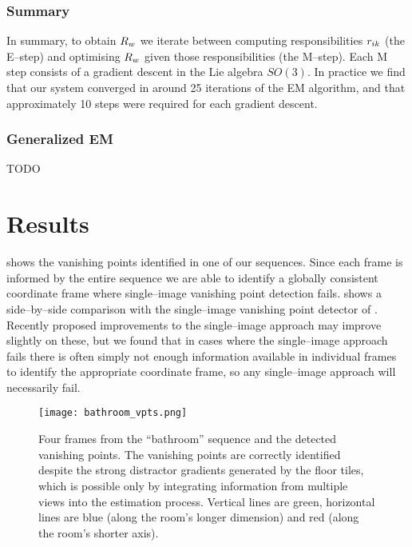 \subsubsection{Summary}
In summary, to obtain $\SceneR$ we iterate between computing
responsibilities $\Resp_{ik}$ (the E--step) and optimising $\SceneR$
given those responsibilities (the M--step). Each M step consists of a
gradient descent in the Lie algebra $SO(3)$. In practice we find that
our system converged in around 25 iterations of the EM algorithm, and
that approximately 10 steps were required for each gradient
descent. 

\subsubsection{Generalized EM}

TODO

\section{Results}

 shows the vanishing points identified in one of
our sequences. Since each frame is informed by the entire sequence we
are able to identify a globally consistent coordinate frame where
single--image vanishing point detection fails. 
shows a side--by--side comparison with the single--image vanishing
point detector of \cite{Zhang02}. Recently proposed improvements to
the single--image approach \cite{Tardif09} may improve slightly on
these, but we found that in cases where the single--image approach
fails there is often simply not enough information available in
individual frames to identify the appropriate coordinate frame, so any
single--image approach will necessarily fail.

\begin{figure}[tb]
  \centering
  \texttt{[image: bathroom\_vpts.png]}
  \caption{Four frames from the ``bathroom'' sequence and the detected
    vanishing points. The vanishing points are correctly identified
    despite the strong distractor gradients generated by the floor
    tiles, which is possible only by integrating information from
    multiple views into the estimation process. Vertical lines are
    green, horizontal lines are blue (along the room's longer
    dimension) and red (along the room's shorter axis).}
  \label{fig:bathroom-vpts}
\end{figure}

